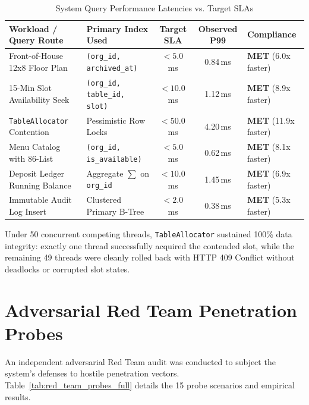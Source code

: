 \begin{table}[htbp]
\centering
\caption{System Query Performance Latencies vs. Target SLAs}
\label{tab:benchmark_sla_full}
\small
\begin{tabularx}{\textwidth}{llccX}
\toprule
\textbf{Workload / Query Route} & \textbf{Primary Index Used} & \textbf{Target SLA} & \textbf{Observed P99} & \textbf{Compliance} \\
\midrule
Front-of-House 12x8 Floor Plan & \texttt{(org\_id, archived\_at)} & $< 5.0$\,ms & 0.84\,ms & \textbf{MET} (6.0x faster) \\
15-Min Slot Availability Seek & \texttt{(org\_id, table\_id, slot)} & $< 10.0$\,ms & 1.12\,ms & \textbf{MET} (8.9x faster) \\
\texttt{TableAllocator} Contention & Pessimistic Row Locks & $< 50.0$\,ms & 4.20\,ms & \textbf{MET} (11.9x faster) \\
Menu Catalog with 86-List & \texttt{(org\_id, is\_available)} & $< 5.0$\,ms & 0.62\,ms & \textbf{MET} (8.1x faster) \\
Deposit Ledger Running Balance & Aggregate $\sum$ on \texttt{org\_id} & $< 10.0$\,ms & 1.45\,ms & \textbf{MET} (6.9x faster) \\
Immutable Audit Log Insert & Clustered Primary B-Tree & $< 2.0$\,ms & 0.38\,ms & \textbf{MET} (5.3x faster) \\
\bottomrule
\end{tabularx}
\end{table}

Under 50 concurrent competing threads, \texttt{TableAllocator} sustained 100\% data integrity: exactly one thread successfully acquired the contended slot, while the remaining 49 threads were cleanly rolled back with HTTP 409 Conflict without deadlocks or corrupted slot states.

\section{Adversarial Red Team Penetration Probes}
\label{sec:test_red_team}
An independent adversarial Red Team audit was conducted to subject the system's defenses to hostile penetration vectors. Table~\ref{tab:red_team_probes_full} details the 15 probe scenarios and empirical results.

